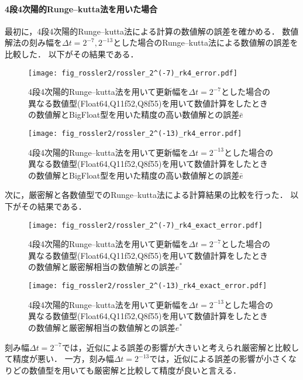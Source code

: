 \paragraph*{4段4次陽的Runge--kutta法を用いた場合}
最初に，4段4次陽的Runge--kutta法による計算の数値解の誤差を確かめる．
数値解法の刻み幅を$\Delta t = 2^{-7},2^{-13}$とした場合のRunge--kutta法による数値解の誤差を比較した．
以下がその結果である．
\begin{figure}[H]
    \centering
    \begin{minipage}[b]{0.49\columnwidth}
        \centering
        \texttt{[image: fig\_rossler2/rossler\_2^(-7)\_rk4\_error.pdf]}
        \caption{4段4次陽的Runge--kutta法を用いて更新幅を$\Delta t = 2^{-7}$とした場合の異なる数値型(Float64,Q11f52,Q8f55)を用いて数値計算をしたときの数値解とBigFloat型を用いた精度の高い数値解との誤差$\bar{e}$}
        \label{fig:rossler_2^(-7)_rk4_error}
    \end{minipage}
    \begin{minipage}[b]{0.49\columnwidth}
        \centering
        \texttt{[image: fig\_rossler2/rossler\_2^(-13)\_rk4\_error.pdf]}
        \caption{4段4次陽的Runge--kutta法を用いて更新幅を$\Delta t =  2^{-13}$とした場合の異なる数値型(Float64,Q11f52,Q8f55)を用いて数値計算をしたときの数値解とBigFloat型を用いた精度の高い数値解との誤差$\bar{e}$}
        \label{fig:rossler_2^(-13)_rk4_error}
    \end{minipage}   
\end{figure}


次に，厳密解と各数値型でのRunge--kutta法による計算結果の比較を行った．
以下がその結果である．\\
\begin{figure}[H]
    \centering
    \begin{minipage}[b]{0.49\columnwidth}
        \centering
        \texttt{[image: fig\_rossler2/rossler\_2^(-7)\_rk4\_exact\_error.pdf]}
        \caption{4段4次陽的Runge--kutta法を用いて更新幅を$\Delta t = 2^{-7}$とした場合の異なる数値型(Float64,Q11f52,Q8f55)を用いて数値計算をしたときの数値解と厳密解相当の数値解との誤差$e^{\ast}$}   
        \label{fig:rossler_2^(-7)_rk4_exact_error}
    \end{minipage}
    \begin{minipage}[b]{0.49\columnwidth}
        \centering
        \texttt{[image: fig\_rossler2/rossler\_2^(-13)\_rk4\_exact\_error.pdf]}
        \caption{4段4次陽的Runge--kutta法を用いて更新幅を$\Delta t =  2^{-13}$とした場合の異なる数値型(Float64,Q11f52,Q8f55)を用いて数値計算をしたときの数値解と厳密解相当の数値解との誤差$e^{\ast}$}
        \label{fig:rossler_2^(-13)_rk4_exact_error}
    \end{minipage}
\end{figure}
刻み幅$\Delta t = 2^{-7}$では，近似による誤差の影響が大きいと考えられ厳密解と比較して精度が悪い．
一方，刻み幅$\Delta t =  2^{-13}$では，近似による誤差の影響が小さくなりどの数値型を用いても厳密解と比較して精度が良いと言える．

